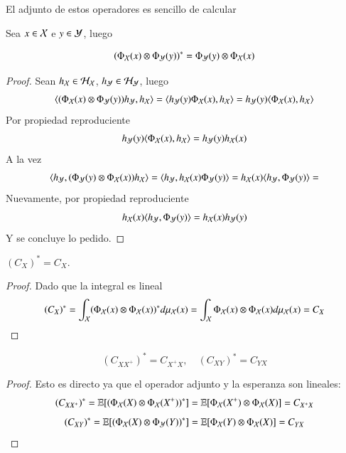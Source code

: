 	El adjunto de estos operadores es sencillo de calcular
	\begin{prop}
		Sea $x \in \mathcal{X}$ e $y \in \mathcal{Y}$, luego
		
		\begin{equation*}
			\left ( \Phi_{\mathcal{X}} (x) \otimes \Phi_{\mathcal{Y}} (y) \right )^* = \Phi_{\mathcal{Y}} (y) \otimes \Phi_{\mathcal{X}} (x)
		\end{equation*}
	\end{prop}
	\begin{proof}
		Sean $h_{\mathcal{X}} \in \mathcal{H}_{\mathcal{X}}$, $h_{\mathcal{Y}} \in \mathcal{H}_{\mathcal{Y}}$, luego
		\begin{equation*}
			\langle (\Phi_{\mathcal{X}} (x) \otimes \Phi_{\mathcal{Y}} (y)) h_{\mathcal{Y}}, h_{\mathcal{X}} \rangle = \langle h_{\mathcal{Y}} (y) \Phi_{\mathcal{X}} (x), h_{\mathcal{X}} \rangle = h_{\mathcal{Y}} (y) \langle \Phi_{\mathcal{X}} (x), h_{\mathcal{X}} \rangle
		\end{equation*}
		Por propiedad reproduciente
		\begin{equation*}
			h_{\mathcal{Y}} (y) \langle  \Phi_{\mathcal{X}} (x), h_{\mathcal{X}} \rangle = h_{\mathcal{Y}} (y) h_{\mathcal{X}} (x)
		\end{equation*}
		A la vez
		\begin{equation*}
			\langle h_{\mathcal{Y}}, (\Phi_{\mathcal{Y}} (y) \otimes \Phi_{\mathcal{X}} (x)) h_{\mathcal{X}} \rangle = \langle h_{\mathcal{Y}}, h_{\mathcal{X}} (x) \Phi_{\mathcal{Y}} (y) \rangle = h_{\mathcal{X}} (x) 
			\langle h_{\mathcal{Y}}, \Phi_{\mathcal{Y}} (y) \rangle =
		\end{equation*}
		Nuevamente, por propiedad reproduciente
		\begin{equation*}
			h_{\mathcal{X}} (x) 
			\langle h_{\mathcal{Y}}, \Phi_{\mathcal{Y}} (y) \rangle =h_{\mathcal{X}} (x) h_{\mathcal{Y}} (y) 
		\end{equation*}
		Y se concluye lo pedido.
	\end{proof}
	
	\begin{cor} $(C_{X})^* = C_X$.
        \label{cor:CX_autoad}
	\end{cor}
    \begin{proof}
        Dado que la integral es lineal
	\begin{equation*}
		(C_X)^* = \int_{\mathcal{X}} (\Phi_{\mathcal{X}} (x) \otimes \Phi_{\mathcal{X}} (x))^* d \mu_{\mathcal{X}} (x) = \int_{\mathcal{X}} \Phi_{\mathcal{X}} (x) \otimes \Phi_{\mathcal{X}} (x) d \mu_{\mathcal{X}} (x) = C_X
	\end{equation*}
    \end{proof}
	
    \begin{cor}
        \begin{equation*}
            (C_{XX^+})^* = C_{X^+X}, \quad (C_{XY})^* = C_{YX}
        \end{equation*}
    \end{cor}
    \begin{proof}
        Esto es directo ya que el operador adjunto y la esperanza son lineales:
\begin{equation*}
    (C_{X X^+})^* = \mathbb{E} [(\Phi_{\mathcal{X}} (X) \otimes \Phi_{\mathcal{X}} (X^+))^*] = \mathbb{E} [\Phi_{\mathcal{X}} (X^+) \otimes \Phi_{\mathcal{X}} (X)] = C_{X^+X} 
\end{equation*}
\begin{equation*}
    (C_{X Y})^* = \mathbb{E} [(\Phi_{\mathcal{X}} (X) \otimes \Phi_{\mathcal{Y}} (Y))^*] = \mathbb{E} [\Phi_{\mathcal{X}} (Y) \otimes \Phi_{\mathcal{X}} (X)] = C_{YX} 
\end{equation*}
    \end{proof}
	
